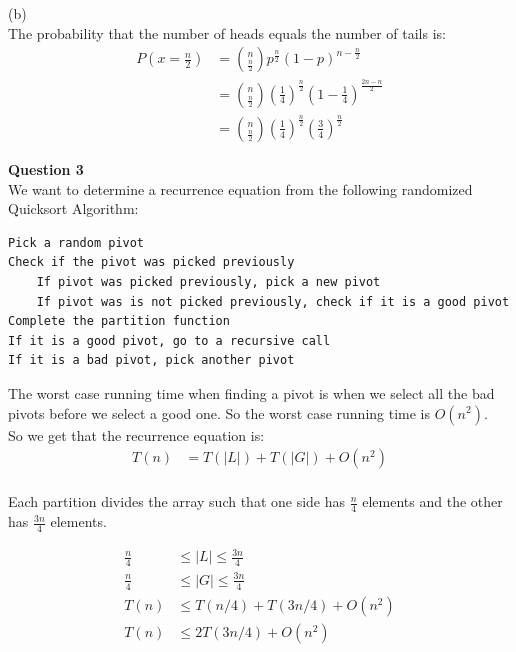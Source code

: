 \documentclass{article}
\begin{document}
\bigskip
(b)\\
The probability that the number of heads equals the number of tails is:\\
\begin{equation*} 
\begin{split}
    P(x=\frac{n}{2})&={n \choose \frac{n}{2}} p^{\frac{n}{2}}(1-p)^{n-\frac{n}{2}}\\
    &={n \choose \frac{n}{2}}(\frac{1}{4})^{\frac{n}{2}}(1-\frac{1}{4})^{\frac{2n-n}{2}}\\
    &={n \choose \frac{n}{2}}(\frac{1}{4})^{\frac{n}{2}}(\frac{3}{4})^{\frac{n}{2}}
\end{split}
\end{equation*} 

\bigskip
{\bf Question 3}\\
We want to determine a recurrence equation from the following randomized Quicksort Algorithm:
\begin{lstlisting}
Pick a random pivot
Check if the pivot was picked previously 
    If pivot was picked previously, pick a new pivot
    If pivot was is not picked previously, check if it is a good pivot
Complete the partition function
If it is a good pivot, go to a recursive call
If it is a bad pivot, pick another pivot
\end{lstlisting}
The worst case running time when finding a pivot is when we select all the bad pivots before we select a good one. So the worst case running time is $O(n^2)$.\\
So we get that the recurrence equation is:
\begin{equation*} 
\begin{split}
    T(n) &= T(|L|) + T(|G|) + O(n^2)\\
\end{split}
\end{equation*}

Each partition divides the array such that one side has $\frac{n}{4}$ elements and the other has $\frac{3n}{4}$ elements.

\begin{equation*}
\begin{split}
    \frac{n}{4} &\leq |L| \leq \frac{3n}{4}\\
    \frac{n}{4} &\leq |G| \leq \frac{3n}{4}\\
    T(n) &\leq T(n/4)+T(3n/4)+O(n^2)\\
    T(n) &\leq 2T(3n/4)+O(n^2)\\
    \end{split}
\end{equation*}
\end{document}
